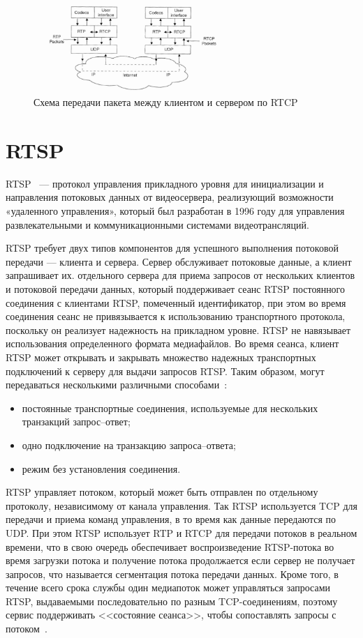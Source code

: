 \begin{figure}[h]
	\centering
	\includegraphics[width=0.67\textwidth]{img/rtcp_over_udp.png}
	\caption{Схема передачи пакета между клиентом и сервером по RTCP~\cite{rtp_rtcp_rtsp_mc}}
	\label{pr:rtcp_udp}
\end{figure}

\section{RTSP}

RTSP~\cite{rfc_rtsp} --- протокол управления прикладного уровня для инициализации и направления потоковых данных от видеосервера, реализующий возможности «удаленного управления», который был разработан в 1996 году для управления развлекательными и коммуникационными системами видеотрансляций.

RTSP требует двух типов компонентов для успешного выполнения потоковой передачи --- клиента и сервера. Сервер обслуживает потоковые данные, а клиент запрашивает их. отдельного сервера для приема запросов от нескольких клиентов и потоковой передачи данных, который поддерживает сеанс RTSP постоянного соединения с клиентами RTSP, помеченный идентификатор, при этом во время соединения сеанс не привязывается к использованию транспортного протокола, поскольку он реализует надежность на прикладном уровне. RTSP не навязывает использования определенного формата медиафайлов.
Во время сеанса, клиент RTSP может открывать и закрывать множество надежных транспортных подключений к серверу для выдачи запросов RTSP. 
Таким образом, могут передаваться несколькими различными способами~\cite{rfc_rtsp}:
\begin{itemize}
	\item постоянные транспортные соединения, используемые для нескольких транзакций запрос--ответ;
	\item одно подключение на транзакцию запроса--ответа;
	\item режим без установления соединения. 
\end{itemize}

RTSP управляет потоком, который может быть отправлен по отдельному протоколу, независимому от канала управления.
Так RTSP используется TCP для передачи и приема команд управления, в то время как данные передаются по UDP. При этом RTSP использует RTP и RTCP для передачи потоков в реальном времени, что в свою очередь обеспечивает воспроизведение RTSP-потока во время загрузки потока и получение потока продолжается если сервер не получает запросов, что называется сегментация потока передачи данных. 
Кроме того, в течение всего срока службы один медиапоток может управляться запросами RTSP, выдаваемыми последовательно по разным TCP-соединениям, поэтому сервис поддерживать <<состояние сеанса>>, чтобы сопоставлять запросы с потоком~\cite{rfc_rtsp}. 

